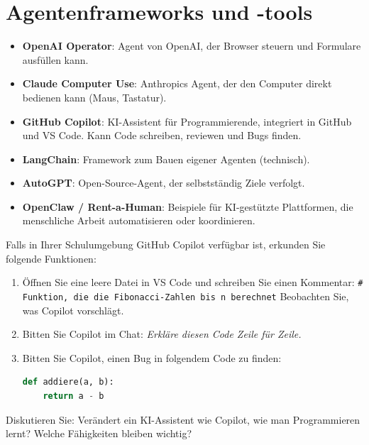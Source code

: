 \section{Agentenframeworks und -tools}

\begin{myoverview}
      \begin{itemize}
            \item \textbf{OpenAI Operator}: Agent von OpenAI, der Browser steuern und
                  Formulare ausfüllen kann.
            \item \textbf{Claude Computer Use}: Anthropics Agent, der den Computer
                  direkt bedienen kann (Maus, Tastatur).
            \item \textbf{GitHub Copilot}: KI-Assistent für Programmierende, integriert
                  in GitHub und VS Code. Kann Code schreiben, reviewen und Bugs finden.
            \item \textbf{LangChain}: Framework zum Bauen eigener Agenten (technisch).
            \item \textbf{AutoGPT}: Open-Source-Agent, der selbstständig Ziele verfolgt.
            \item \textbf{OpenClaw / Rent-a-Human}: Beispiele für KI-gestützte
                  Plattformen, die menschliche Arbeit automatisieren oder koordinieren.
      \end{itemize}
\end{myoverview}

\begin{mychallenge}
      Falls in Ihrer Schulumgebung GitHub Copilot verfügbar ist, erkunden Sie
      folgende Funktionen:

      \begin{enumerate}
            \item Öffnen Sie eine leere Datei in VS Code und schreiben Sie einen Kommentar:
                  \texttt{\# Funktion, die die Fibonacci-Zahlen bis n berechnet}
                  Beobachten Sie, was Copilot vorschlägt.
            \item Bitten Sie Copilot im Chat: \textit{Erkläre diesen Code Zeile für Zeile.}
            \item Bitten Sie Copilot, einen Bug in folgendem Code zu finden:
                  \begin{lstlisting}[language=Python]
def addiere(a, b):
    return a - b
\end{lstlisting}
      \end{enumerate}

      Diskutieren Sie: Verändert ein KI-Assistent wie Copilot, wie man Programmieren lernt?
      Welche Fähigkeiten bleiben wichtig?
\end{mychallenge}

